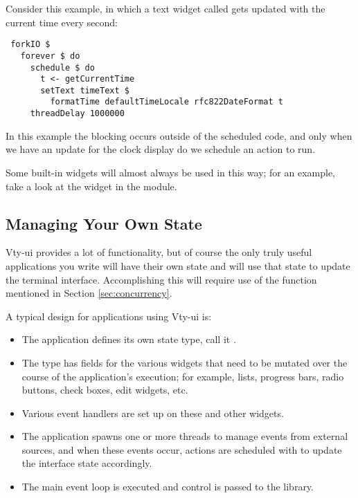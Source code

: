 Consider this example, in which a text widget called 
gets updated with the current time every second:

\begin{verbatim}
 forkIO $
   forever $ do
     schedule $ do
       t <- getCurrentTime
       setText timeText $
         formatTime defaultTimeLocale rfc822DateFormat t
     threadDelay 1000000
\end{verbatim}

In this example the blocking occurs outside of the scheduled code, and
only when we have an update for the clock display do we schedule an
action to run.

Some built-in widgets will almost always be used in this way; for an
example, take a look at the  widget in the
 module.

\subsection{Managing Your Own State}

Vty-ui provides a lot of functionality, but of course the only truly
useful applications you write will have their own state and will use
that state to update the terminal interface.  Accomplishing this will
require use of the  function mentioned in Section
\ref{sec:concurrency}.

A typical design for applications using Vty-ui is:

\begin{itemize}
\item The application defines its own state type, call it
  .
\item The  type has fields for the various widgets that
  need to be mutated over the course of the application's execution;
  for example, lists, progress bars, radio buttons, check boxes, edit
  widgets, etc.
\item Various event handlers are set up on these and other widgets.
\item The application spawns one or more threads to manage events from
  external sources, and when these events occur, actions are scheduled
  with  to update the interface state accordingly.
\item The main event loop is executed and control is passed to the
  library.
\end{itemize}

